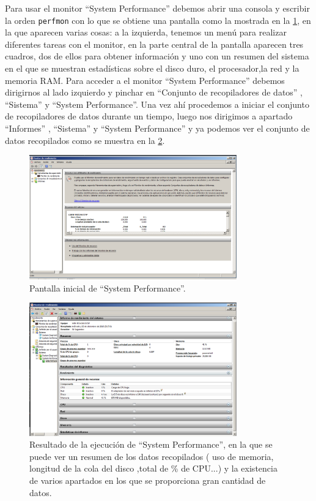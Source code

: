 Para usar el monitor ``System Performance'' debemos abrir una consola y escribir la orden \texttt{perfmon} con lo que se obtiene una pantalla como la mostrada en la  \cref{fig4}, en la que aparecen varias cosas: a la izquierda, tenemos un menú para realizar diferentes tareas con el monitor, en la parte central de la pantalla aparecen tres cuadros, dos de ellos para obtener información y uno con un resumen del sistema en el que se muestran estadísticas sobre el disco duro, el procesador,la red y la memoria RAM. Para acceder a el monitor ``System Performance'' debemos dirigirnos al lado izquierdo y pinchar en ``Conjunto de  recopiladores de datos'' , ``Sistema'' y ``System Performance''. Una vez ahí procedemos a iniciar el conjunto de recopiladores de datos durante un tiempo, luego nos dirigimos a apartado ``Informes'' , ``Sistema'' y ``System Performance'' y ya podemos ver el conjunto de datos recopilados como se muestra en la \cref{fig29}.

\begin{figure}[H]
  \begin{center}
    \includegraphics[width=0.8\textwidth]{imagenes/perfmon}
    \caption{Pantalla inicial de ``System Performance''.}
    \label{fig4}
  \end{center}
\end{figure}

\begin{figure}[H]
  \begin{center}
    \includegraphics[width=0.8\textwidth]{imagenes/perfmon2}
    \caption{Resultado de la ejecución de ``System Performance'', en la que se puede ver un resumen de los datos recopilados ( uso de memoria, longitud de la cola del disco ,total de \% de CPU...) y la existencia de varios apartados en los que se proporciona gran cantidad de datos.}
    \label{fig29}
  \end{center}
\end{figure}

